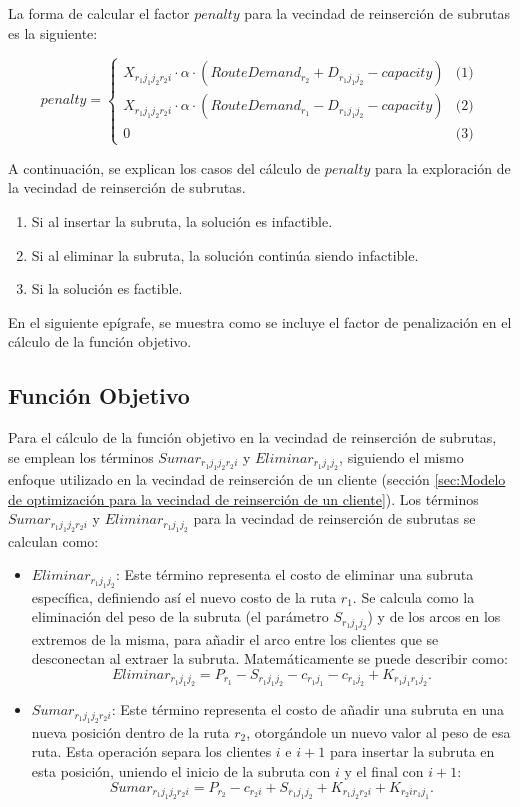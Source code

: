 \documentclass[12pt]{report}
\begin{document}
	La forma de calcular el factor $penalty$ para la vecindad de reinserción de subrutas es la siguiente:


	\[ 			penalty =
	\begin{cases}
		X_{r_1j_1j_2r_2i} \cdot \alpha \cdot (RouteDemand_{r_2} + D_{r_1j_1j_2} - capacity) & \text{(1)} \\
		X_{r_1j_1j_2r_2i} \cdot \alpha \cdot (RouteDemand_{r_1} - D_{r_1j_1j_2} - capacity) & \text{(2)} \\
		0 & \text{(3)}
	\end{cases} \]


	A continuación, se explican los casos del cálculo de $penalty$ para la exploración de la vecindad de reinserción de subrutas.

	\begin{enumerate}
		\item Si al insertar la subruta, la solución es infactible.
		\item Si al eliminar la subruta, la solución continúa siendo infactible.
		\item Si la solución es factible.
	\end{enumerate}

	En el siguiente epígrafe, se muestra como se incluye el factor de penalización en el cálculo de la función objetivo.

	\subsection{Función Objetivo}

	Para el cálculo de la función objetivo en la vecindad de reinserción de subrutas, se emplean los términos $Sumar_{r_1j_1j_2r_2i}$ y $Eliminar_{r_1j_1j_2}$, siguiendo el mismo enfoque utilizado en la vecindad de reinserción de un cliente (sección \ref{sec:Modelo de optimización para la vecindad de reinserción de un cliente}). Los términos $Sumar_{r_1j_1j_2r_2i}$ y $Eliminar_{r_1j_1j_2}$ para la vecindad de reinserción de subrutas se calculan como:

	\begin{itemize}
		\item $Eliminar_{r_1j_1j_2}$: Este término representa el costo de eliminar una subruta específica, definiendo así el nuevo costo de la ruta $r_1$. Se calcula como la eliminación del peso de la subruta (el parámetro $S_{r_1j_1j_2}$) y de los arcos en los extremos de la misma, para añadir el arco entre los clientes que se desconectan al extraer la subruta. Matemáticamente se puede describir como:
		\[
		Eliminar_{r_1j_1j_2}= P_{r_1}-S_{{r_1}{j_1}{j_2}}-c_{{r_1}{j_1}}-c_{{r_1}{j_2}}+K_{{r_1}{j_1}{r_1}{j_2}}\text{.}
		\]
		\item $Sumar_{r_1j_1j_2r_2i}$: Este término representa el costo de añadir una subruta en una nueva posición dentro de la ruta $r_2$, otorgándole un nuevo valor al peso de esa ruta. Esta operación separa los clientes $i$ e $i+1$ para insertar la subruta en esta posición, uniendo el inicio de la subruta con $i$ y el final con $i+1$:
		\[
		Sumar_{r_1j_1j_2r_2i}= P_{r_2} - c_{{r_2}{i}} + S_{{r_1}{j_1}{j_2}}+K_{{r_1}{j_2}{r_2}{i}} + K_{{r_2}{i}{r_1}{j_1}}\text{.}
		\]
	\end{itemize}
\end{document}
